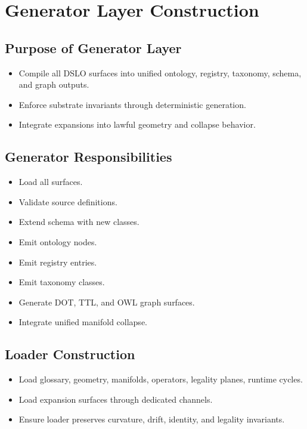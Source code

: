 \section{Generator Layer Construction}

\subsection{Purpose of Generator Layer}
\begin{itemize}
    \item Compile all DSLO surfaces into unified ontology, registry, taxonomy, schema, and graph outputs.
    \item Enforce substrate invariants through deterministic generation.
    \item Integrate expansions into lawful geometry and collapse behavior.
\end{itemize}

\subsection{Generator Responsibilities}
\begin{itemize}
    \item Load all surfaces.
    \item Validate source definitions.
    \item Extend schema with new classes.
    \item Emit ontology nodes.
    \item Emit registry entries.
    \item Emit taxonomy classes.
    \item Generate DOT, TTL, and OWL graph surfaces.
    \item Integrate unified manifold collapse.
\end{itemize}

\subsection{Loader Construction}
\begin{itemize}
    \item Load glossary, geometry, manifolds, operators, legality planes, runtime cycles.
    \item Load expansion surfaces through dedicated channels.
    \item Ensure loader preserves curvature, drift, identity, and legality invariants.
\end{itemize}

